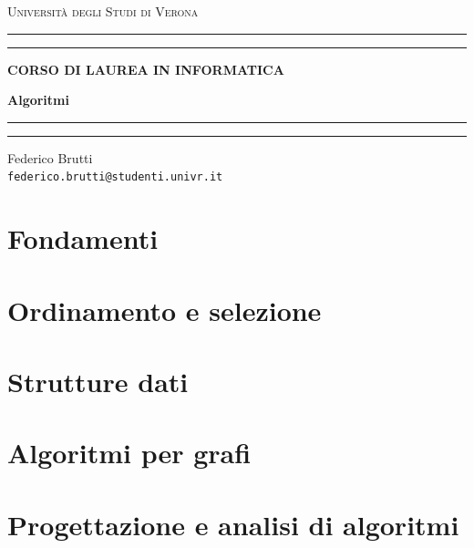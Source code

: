 \documentclass[12pt, a4paper, oneside]{book}
\begin{document}
	
	\begin{titlepage}
		\begin{center}
			{{\LARGE{\textsc{Università degli Studi di Verona}}}} \rule[0.1cm]{15.8cm}{0.1mm}
			\rule[0.5cm]{15.8cm}{0.6mm}
			{\small{\bf CORSO DI LAUREA IN INFORMATICA}}
		\end{center}
		\vspace{12.5mm}
		
		\begin{center}
			{\Huge{\bf Algoritmi}}
		\end{center}
		\vspace{130mm}
		
		\begin{minipage}[l]{1.8mm}
			\rule[0.1cm]{0.1mm}{2cm}
			\rule[0.1cm]{0.6mm}{2cm}
		\end{minipage}
		\hspace{2mm}
		\begin{minipage}{10cm}	
			{\large{Federico Brutti\\
			\texttt{federico.brutti@studenti.univr.it}}}
		\end{minipage}
	\end{titlepage}
	
	\blankpage
	\tableofcontents
	
	\chapter{Fondamenti}
	
	\chapter{Ordinamento e selezione}
	
	\chapter{Strutture dati}
	
	\chapter{Algoritmi per grafi}
	
	\chapter{Progettazione e analisi di algoritmi}
	
\end{document}
